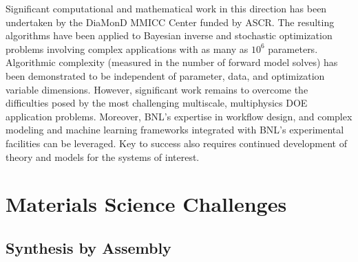 \documentclass[11pt]{article}
\begin{document}
Significant computational and mathematical work in this direction has
been undertaken by the DiaMonD MMICC Center funded by ASCR. The
resulting algorithms have been applied to Bayesian inverse and
stochastic optimization problems involving complex applications with
as many as $10^6$ parameters.  Algorithmic complexity (measured in the
number of forward model solves) has been demonstrated to be
independent of parameter, data, and optimization variable dimensions.
However, significant work remains to overcome the difficulties posed
by the most challenging multiscale, multiphysics DOE application
problems.  Moreover, BNL's expertise in workflow design, and complex
modeling and machine learning frameworks integrated with BNL's experimental
facilities can be leveraged.  Key to success also requires continued
development of theory and models for the systems of interest.

\section{Materials Science Challenges}

\subsection{Synthesis by Assembly}
\end{document}
